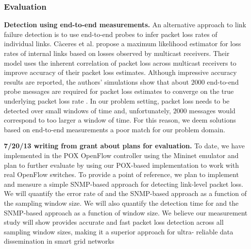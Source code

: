 



\subsubsection{\pcnt Evaluation}


{\bf Detection using end-to-end measurements.}
An alternative approach to link failure detection is to use end-to-end probes to infer packet loss rates of individual links. C\`{a}ceres et al. \cite{Caceres99} propose a maximum likelihood estimator
for loss rates of internal links based on losses observed by multicast receivers. Their model uses the inherent correlation of packet loss across multicast receivers to improve accuracy 
of their packet loss estimates.  Although impressive accuracy results are reported, the authors' simulations show that about $2000$ end-to-end probe messages are required for packet loss
estimates to converge on the true underlying packet loss rate \cite{Caceres99}.  In our problem setting, packet loss needs to be detected over small windows of time and, unfortunately,
$2000$ messages would correspond to too larger a window of time. For this reason, we deem solutions based on end-to-end measurements a poor match for our problem domain.

{\bf 7/20/13 writing from grant about plans for evaluation.}
To date, we have implemented \pcnt in the POX OpenFlow controller using the Mininet emulator and plan to further evaluate \pcnt by using our POX-based implementation to work with real
OpenFlow switches.  To provide a point of reference, we plan to implement and measure a simple SNMP-based approach for detecting link-level packet loss.  We will quantify the error rate of \pcnt 
and the SNMP-based approach as a function of the sampling window size.  We will also quantify the detection time for \pcnt and the SNMP-based approach as a function of window size. We believe our measurement study will show \pcnt  provides accurate and fast packet loss detection across all sampling window sizes, making it a superior approach for ultra- reliable data dissemination in smart grid networks








